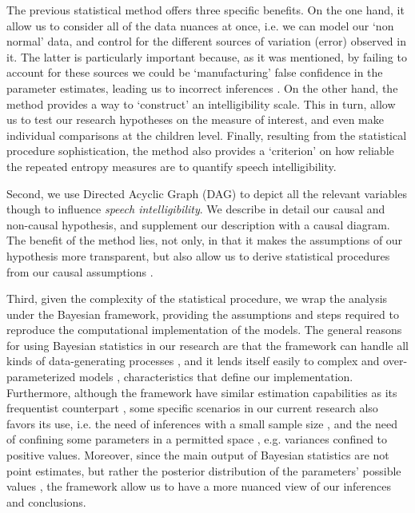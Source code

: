 The previous statistical method offers three specific benefits. On the one hand, it allow us to consider all of the data nuances at once, i.e. we can model our `non normal' data, and control for the different sources of variation (error) observed in it. The latter is particularly important because, as it was mentioned, by failing to account for these sources we could be `manufacturing' false confidence in the parameter estimates, leading us to incorrect inferences \cite{McElreath_2020}. On the other hand, the method provides a way to `construct' an intelligibility scale. This in turn, allow us to test our research hypotheses on the measure of interest, and even make individual comparisons at the children level. Finally, resulting from the statistical procedure sophistication, the method also provides a `criterion' on how reliable the repeated entropy measures are to quantify speech intelligibility.

Second, we use Directed Acyclic Graph (DAG) \cite{Pearl_2009, Cinelli_et_al_2021} to depict all the relevant variables though to influence \textit{speech intelligibility}. We describe in detail our causal and non-causal hypothesis, and supplement our description with a causal diagram. The benefit of the method lies, not only, in that it makes the assumptions of our hypothesis more transparent, but also allow us to derive statistical procedures from our causal assumptions \cite{McElreath_2020, Yarkoni_2020, Rohrer_et_al_2021}.

Third, given the complexity of the statistical procedure, we wrap the analysis under the Bayesian framework, providing the assumptions and steps required to reproduce the computational implementation of the models. The general reasons for using Bayesian statistics in our research are that the framework can handle all kinds of data-generating processes \cite{Fox_2010}, and it lends itself easily to complex and over-parameterized models \cite{Baker_1998, Kim_1999}, characteristics that define our implementation. Furthermore, although the framework have similar estimation capabilities as its frequentist counterpart \cite{Baker_1998, Hsieh_2010, Wollack_2002}, some specific scenarios in our current research also favors its use, i.e. the need of inferences with a small sample size \cite{Fox_2010, McElreath_2020, Skrondal_et_al_2004a}, and the need of confining some parameters in a permitted space \cite{Martin_et_al_1975}, e.g. variances confined to positive values. Moreover, since the main output of Bayesian statistics are not point estimates, but rather the posterior distribution of the parameters' possible values \cite{McElreath_2020}, the framework allow us to have a more nuanced view of our inferences and conclusions.

